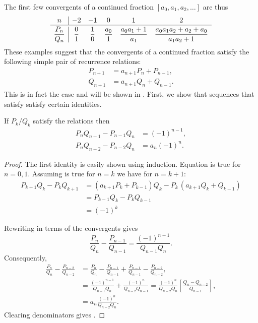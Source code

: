 The first few convergents of a continued fraction
$[a_0, a_1, a_2, \ldots]$ are thus
\[
\begin{array}{c|ccccc}
n & -2 & -1 & 0 & 1 & 2 \\ \hline\noalign{\vspace{2pt}}
\displaystyle\frac{P_n}{Q_n} & \displaystyle\frac{0}{1}& \displaystyle\frac{1}{0}&
\displaystyle\frac{a_0}{1}& \displaystyle\frac{a_0 a_1 + 1}{a_1} &
\displaystyle\frac{a_0 a_1 a_2 + a_2 + a_0}{a_1 a_2 + 1}
\end{array}
\]
These examples suggest that the convergents of a continued fraction
satisfy the following simple pair of recurrence relations:
\begin{equation}
\label{CFRecurrence:Eq}
 \begin{aligned}
  P_{n+1} &= a_{n+1} P_n + P_{n-1},\\
  Q_{n+1} &= a_{n+1} Q_n + Q_{n-1}.
 \end{aligned}
\end{equation}
This is in fact the case and will be shown in
. First, we show that sequences that
satisfy  satisfy certain identities.

\begin{proposition}\label{CF:Identities:Prop}
If $P_k/Q_k$ satisfy the relations  then 
\begin{align}
  P_n Q_{n-1} - P_{n-1} Q_n &= (-1)^{n-1}, \label{CFUnitIdentity:Eq} \\
  P_n Q_{n-2} - P_{n-2} Q_n &= a_n(-1)^{n}. \label{CF:2Dif:Identity:Eq} 
\end{align}
\end{proposition}

\begin{proof}
The first identity is easily shown using induction.  Equation
 is true for $n= 0, 1$.  Assuming
 is true for $n = k$ we have for $n = k+1$: 
\[
\begin{aligned}
  P_{k+1} Q_k - P_k Q_{k+1}
    & =(a_{k+1} P_k + P_{k-1}) Q_k - P_k \,(a_{k+1} Q_k + Q_{k-1})\\
    &= P_{k-1} Q_k - P_k Q_{k-1} \\
    &= (-1)^{k}
\end{aligned}
\]

Rewriting  in terms of the convergents gives
\[
\frac{P_n}{Q_n} - \frac{P_{n-1}}{Q_{n-1}} = \frac{(-1)^{n-1}}{Q_{n-1}
Q_n}.
\]
Consequently,
\[
\begin{aligned}
\frac{P_n}{Q_n} - \frac{P_{n-2}}{Q_{n-2}} &= 
 \frac{P_n}{Q_n} - \frac{P_{n-1}}{Q_{n-1}} + 
 \frac{P_{n-1}}{Q_{n-1}} - \frac{P_{n-2}}{Q_{n-2}}, \\
& = \frac{(-1)^{n-1}}{Q_{n-1}Q_n} + \frac{(-1)^{n}}{Q_{n-2}Q_{n-1}}
  = \frac{(-1)^{n}}{Q_{n-2} Q_n}\left[ \frac{Q_n - Q_{n-2}}{Q_{n-1}}
     \right], \\
 & = a_n \frac{(-1)^n}{Q_{n-2} Q_n}.
\end{aligned}\]
Clearing denominators gives .
\end{proof}

